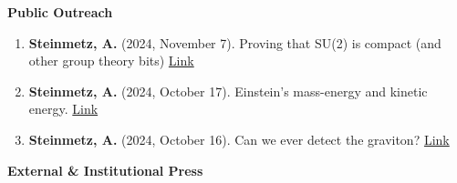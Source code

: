 \documentclass[11pt]{article}
\begin{document}
\medskip

{\large\textbf{Public Outreach}}

\begin{enumerate}[leftmargin=*,nosep]
    \item \textbf{Steinmetz, A.} (2024, November 7). Proving that SU(2) is compact (and other group theory bits) \href{https://ajsteinmetz.github.io/mathematics/2024/11/07/su2-compactness.html}{Link}
    \item \textbf{Steinmetz, A.} (2024, October 17). Einstein’s mass-energy and kinetic energy. \href{https://ajsteinmetz.github.io/physics/2024/10/17/kinetic-energy-coefficient.html}{Link}
    \item \textbf{Steinmetz, A.} (2024, October 16). Can we ever detect the graviton? \href{https://ajsteinmetz.github.io/physics/2024/10/16/graviton-detector.html}{Link}
\end{enumerate}

\medskip

{\Large\textbf{External \& Institutional Press}}
\end{document}
